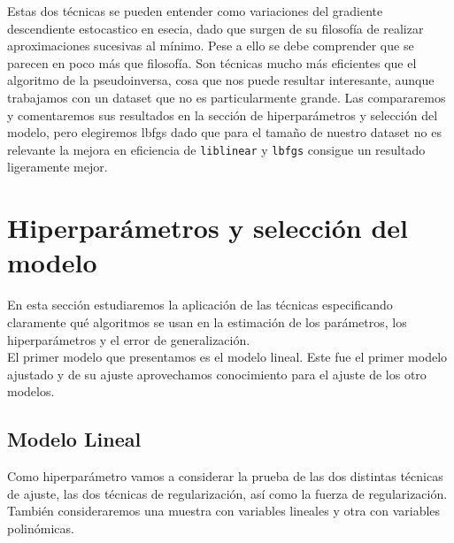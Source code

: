 \documentclass[11pt,a4paper]{article}
\begin{document}
Estas dos técnicas se pueden entender como variaciones del gradiente descendiente estocastico en esecia, dado que surgen de su filosofía de realizar aproximaciones sucesivas al mínimo. Pese a ello se debe comprender que se parecen en poco más que filosofía. Son técnicas mucho más eficientes que el algoritmo de la pseudoinversa, cosa que nos puede resultar interesante, aunque trabajamos con un dataset que no es particularmente grande. Las compararemos y comentaremos sus resultados  en la sección de hiperparámetros y selección del modelo, pero elegiremos lbfgs dado que para el tamaño de nuestro dataset no es relevante la mejora en eficiencia de \texttt{liblinear} y \texttt{lbfgs} consigue un resultado ligeramente mejor.


\section{Hiperparámetros y selección del modelo}
 En esta sección estudiaremos la aplicación de las técnicas especificando claramente qué algoritmos se usan en la estimación de los parámetros, los hiperparámetros y el error de generalización.\\
 
 
 El primer modelo que presentamos es el modelo lineal. Este fue el primer modelo ajustado y de su ajuste aprovechamos conocimiento para el ajuste de los otro modelos. 
 
\subsection{Modelo Lineal}
Como hiperparámetro vamos a considerar la prueba de las dos distintas técnicas de ajuste, las dos técnicas de regularización, así como la fuerza de regularización. También consideraremos una muestra con variables lineales y otra con variables polinómicas. \\
\end{document}
